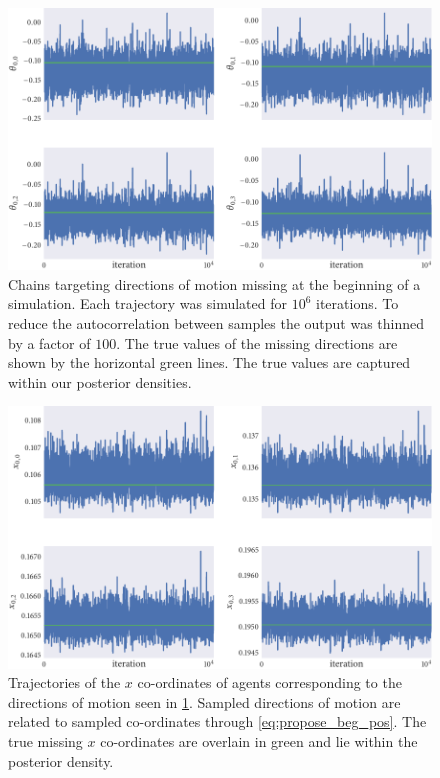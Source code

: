 \begin{figure}[tbp]
  \includegraphics{beg/dir_trace.pdf}
  \caption{Chains targeting directions of motion missing at the beginning of a
  simulation. Each trajectory was simulated for $10^6$ iterations. To reduce
  the autocorrelation between samples the output was thinned by a factor of
  $100$. The true values of the missing directions are shown by the horizontal
  green lines. The true values are captured within our posterior densities.}
  \label{fig:beg_dir_trace}
\end{figure}
\begin{figure}[tbp]
  \includegraphics{beg/x_trace.pdf}
  \caption{Trajectories of the $x$ co-ordinates of agents corresponding to the
  directions of motion seen in \cref{fig:beg_dir_trace}. Sampled directions of
  motion are related to sampled co-ordinates through \cref{eq:propose_beg_pos}.
  The true missing $x$ co-ordinates are overlain in green and lie within the
  posterior density.}
  \label{fig:beg_x_trace}
\end{figure}
